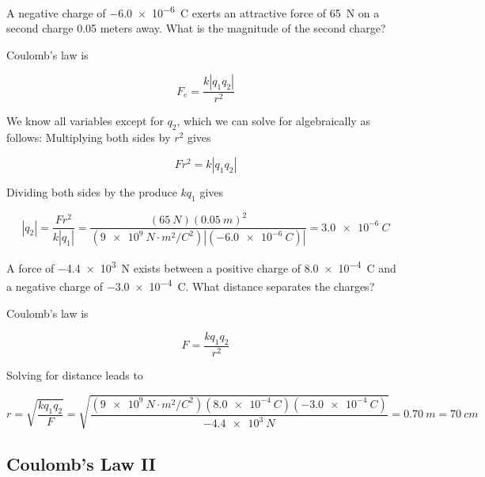 \documentclass[answers]{exam}
\begin{document}
\begin{questions}
\question
A negative charge of \SI{-6.0e-6}{C} exerts an attractive force of \SI{65}{N} on a second charge 0.05 meters away. What is the magnitude of the second charge?

\begin{solutionorbox}[3.3cm]
Coulomb's law is

\begin{equation*}
    F_e = \frac{k\left|q_1q_2\right|}{r^2}
\end{equation*}

We know all variables except for $q_2$, which we can solve for algebraically as follows: Multiplying both sides by $r^2$ gives

\begin{equation*}
    F r^2 = k |q_1 q_2|
\end{equation*}

Dividing both sides by the produce $k q_1$ gives

\begin{equation*}
    |q_2| = \frac{F r^2}{k |q_1|} = \frac{(\SI{65}{N})(\SI{0.05}{m})^2}{(\SI{9e9}{N\cdot m^2/C^2})|(-\SI{6.0e-6}{C})|} = \boxed{\SI{3.0e-6}{C}}
\end{equation*}
\end{solutionorbox}

\question 
A force of \SI{-4.4e3}{N} exists between a positive charge of \SI{8.0e-4}{C} and a negative charge of \SI{-3.0e-4}{C}. What distance separates the charges?

\begin{solutionorbox}[3.3cm]
Coulomb's law is

\begin{equation*}
    F = \frac{k q_1 q_2}{r^2}
\end{equation*}

Solving for distance leads to

\begin{equation*}
    r = \sqrt{\frac{kq_1q_2}{F}} = \sqrt{\frac{(\SI{9e9}{N\cdot m^2/C^2})(\SI{8.0e-4}{C})(\SI{-3.0e-4}{C})}{-\SI{4.4e3}{N}}} = \boxed{\SI{0.70}{m}} = \SI{70}{cm}
\end{equation*}
\end{solutionorbox}

\end{questions}

\clearpage


\subsection*{Coulomb's Law II}
\end{document}
